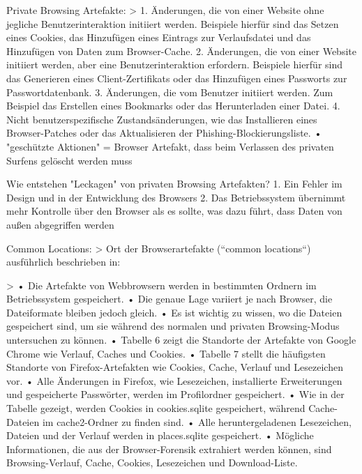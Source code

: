 		

Private Browsing Artefakte: 
	> \cite{Aggarwal.2010}
		1.	Änderungen, die von einer Website ohne jegliche Benutzerinteraktion initiiert werden. Beispiele hierfür sind das Setzen eines Cookies, das Hinzufügen eines Eintrags zur Verlaufsdatei und das Hinzufügen von Daten zum Browser-Cache.
		2.	Änderungen, die von einer Website initiiert werden, aber eine Benutzerinteraktion erfordern. Beispiele hierfür sind das Generieren eines Client-Zertifikats oder das Hinzufügen eines Passworts zur Passwortdatenbank.
		3.	Änderungen, die vom Benutzer initiiert werden. Zum Beispiel das Erstellen eines Bookmarks oder das Herunterladen einer Datei.
		4.	Nicht benutzerspezifische Zustandsänderungen, wie das Installieren eines Browser-Patches oder das Aktualisieren der Phishing-Blockierungsliste.
		•	"geschützte Aktionen" = Browser Artefakt, dass beim Verlassen des privaten Surfens gelöscht werden muss



Wie entstehen "Leckagen" von privaten Browsing Artefakten? \cite{Horsman.2019} %
	1.  Ein Fehler im Design und in der Entwicklung des Browsers 
	2. Das Betriebssystem übernimmt mehr Kontrolle über den Browser als es sollte, was dazu führt, dass Daten von außen abgegriffen werden
	


Common Locations: 
	> Ort der Browserartefakte (“common locations“) ausführlich beschrieben in: \cite{Fayyad.2021}

	> \cite{Izzati.2022}
		•	Die Artefakte von Webbrowsern werden in bestimmten Ordnern im Betriebssystem gespeichert.
		•	Die genaue Lage variiert je nach Browser, die Dateiformate bleiben jedoch gleich.
		•	Es ist wichtig zu wissen, wo die Dateien gespeichert sind, um sie während des normalen und privaten Browsing-Modus untersuchen zu können.
		•	Tabelle 6 zeigt die Standorte der Artefakte von Google Chrome wie Verlauf, Caches und Cookies.
		•	Tabelle 7 stellt die häufigsten Standorte von Firefox-Artefakten wie Cookies, Cache, Verlauf und Lesezeichen vor.
		•	Alle Änderungen in Firefox, wie Lesezeichen, installierte Erweiterungen und gespeicherte Passwörter, werden im Profilordner gespeichert.
		•	Wie in der Tabelle gezeigt, werden Cookies in cookies.sqlite gespeichert, während Cache-Dateien im cache2-Ordner zu finden sind.
		•	Alle heruntergeladenen Lesezeichen, Dateien und der Verlauf werden in places.sqlite gespeichert.
		•	Mögliche Informationen, die aus der Browser-Forensik extrahiert werden können, sind Browsing-Verlauf, Cache, Cookies, Lesezeichen und Download-Liste.
		
